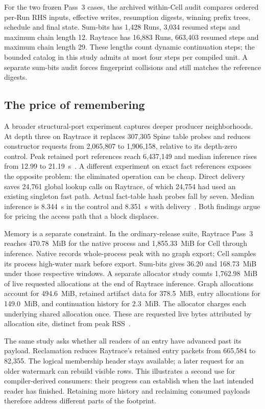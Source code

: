 \documentclass[10pt,letterpaper]{article}
\begin{document}
For the two frozen Pass~3 cases, the archived within-Cell audit compares ordered per-Run RHS inputs, effective writes, resumption digests, winning prefix trees, schedule and final state. Sum-bits has 1,428 Runs, 3,034 resumed steps and maximum chain length 12. Raytrace has 16,883 Runs, 663,403 resumed steps and maximum chain length 29. These lengths count dynamic continuation steps; the bounded catalog in this study admits at most four steps per compiled unit. A separate sum-bits audit forces fingerprint collisions and still matches the reference digests.

\subsection{The price of remembering}
A broader structural-port experiment captures deeper producer neighborhoods. At depth three on Raytrace it replaces 307,305 Spine table probes and reduces constructor requests from 2,065,807 to 1,906,158, relative to its depth-zero control. Peak retained port references reach 6,437,149 and median inference rises from 12.99 to 21.19~s~\cite{cellsource}. A different experiment on exact fact references exposes the opposite problem: the eliminated operation can be cheap. Direct delivery saves 24,761 global lookup calls on Raytrace, of which 24,754 had used an existing singleton fast path. Actual fact-table hash probes fall by seven. Median inference is 8.344~s in the control and 8.351~s with delivery~\cite{receipts}. Both findings argue for pricing the access path that a block displaces.

Memory is a separate constraint. In the ordinary-release suite, Raytrace Pass~3 reaches 470.78~MiB for the native process and 1,855.33~MiB for Cell through inference. Native records whole-process peak with no graph export; Cell samples its process high-water mark before export. Sum-bits gives 36.20 and 168.73~MiB under those respective windows. A separate allocator study counts 1,762.98~MiB of live requested allocations at the end of Raytrace inference. Graph allocations account for 494.6~MiB, retained artifact data for 378.5~MiB, entry allocations for 149.0~MiB, and continuation history for 2.3~MiB. The allocator charges each underlying shared allocation once. These are requested live bytes attributed by allocation site, distinct from peak RSS~\cite{artifact}.

The same study asks whether all readers of an entry have advanced past its payload. Reclamation reduces Raytrace's retained entry packets from 665,584 to 82,355. The logical membership header stays available; a later request for an older watermark can rebuild visible rows. This illustrates a second use for compiler-derived consumers: their progress can establish when the last intended reader has finished. Retaining more history and reclaiming consumed payloads therefore address different parts of the footprint.
\end{document}
